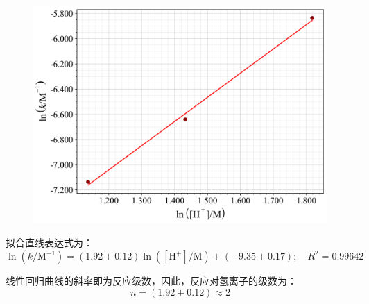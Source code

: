 \begin{figure}[H]
    \centering
    \includegraphics[width=.7\textwidth]{figures/3.png}
    \label{fig:3}
\end{figure}

拟合直线表达式为：
$$
\ln\left(k/\mathrm{M}^{-1}\right) = (1.92 \pm 0.12)\ln\left([\mathrm{H}^+]/\mathrm{M}\right) + (-9.35 \pm 0.17);\quad R^2 = 0.99642
$$

线性回归曲线的斜率即为反应级数，因此，反应对氢离子的级数为：
$$
n = (1.92 \pm 0.12) \approx 2
$$





